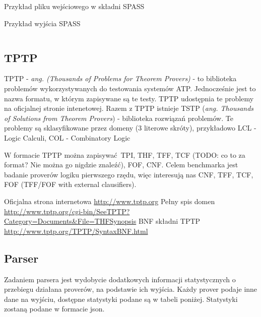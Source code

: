 \documentclass[a4paper,12pt]{article}
\newenvironment{longlisting}{\captionsetup{type=listing}}{}
\begin{document}
\begin{longlisting}
  \caption{Przykład pliku wejściowego w składni SPASS}
\end{longlisting}

\begin{longlisting}
  \caption{Przykład wyjścia SPASS}
  \inputminted{text}{listings/spass_example.out}
\end{longlisting}

\subsection{TPTP}

TPTP - \textit{ang. (Thousands of Problems for Theorem Provers)} - to biblioteka problemów wykorzystywanych do testowania systemów \gls{ATP}. Jednocześnie jest to nazwa formatu, w którym zapisywane są te testy. TPTP udostępnia te problemy na oficjalnej stronie intenetowej. Razem z TPTP istnieje TSTP (\textit{ang. Thousands of Solutions from Theorem Provers}) - biblioteka rozwiązań problemów.
Te problemy są sklasyfikowane przez domeny (3 literowe skróty), przykładowo LCL - Logic Calculi, COL - Combinatory Logic

W formacie TPTP można zapisywać \gls{TPI}, \gls{THF}, \gls{TFF}, TCF (TODO: co to za format? Nie można go nigdzie znaleźć), \gls{FOF}, \gls{CNF}. Celem benchmarka jest badanie proverów logiku pierwszego rzędu, więc interesują nas \gls{CNF}, \gls{TFF}, TCF, \gls{FOF} (TFF/FOF with external clausifiers).


\noindent
Oficjalna strona internetowa \url{http://www.tptp.org}
\newline
Pełny spis domen \url{http://www.tptp.org/cgi-bin/SeeTPTP?Category=Documents&File=THFSynopsis}
\newline
BNF składni TPTP \url{http://www.tptp.org/TPTP/SyntaxBNF.html}

\subsection{Parser} \label{parser}

Zadaniem parsera jest wydobycie dodatkowych informacji statystycznych o przebiegu działana proverów, na podstawie ich wyjścia.
\newline
Każdy prover podaje inne dane na wyjściu, dostępne statystyki podane są w tabeli poniżej.
\newline
Statystyki zostaną podane w formacie json.
\end{document}
